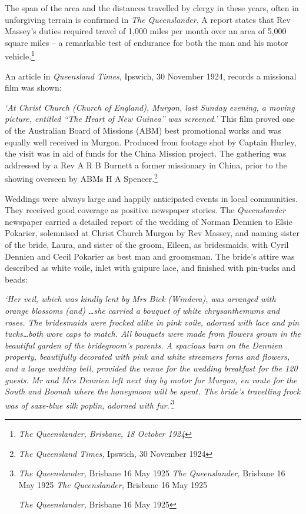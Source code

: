 The span of the area and the distances travelled by clergy in these years, often in unforgiving terrain is confirmed in \emph{The Queenslander}. A report states that Rev Massey's duties required travel of 1,000 miles per month over an area of 5,000 square miles -- a remarkable test of endurance for both the man and his motor vehicle.\footnote{\emph{The Queenslander, Brisbane, 18 October 1924}}


An article in \emph{Queensland Times}, Ipswich, 30 November 1924, records a missional film was shown:



\emph{`At Christ Church (Church of England), Murgon, last Sunday evening, a moving picture, entitled ``The Heart of New Guinea'' was screened.'} This film proved one of the Australian Board of Missions (ABM) best promotional works and was equally well received in Murgon. Produced from footage shot by Captain Hurley, the visit was in aid of funds for the China Mission project\emph{.} The gathering was addressed by a Rev A R B Burnett a former missionary in China, prior to the showing overseen by ABMs H A Spencer.\footnote{\emph{The Queensland Times,} Ipswich, 30 November 1924}


Weddings were always large and happily anticipated events in local communities. They received good coverage as positive newspaper stories. The \emph{Queenslander} newspaper carried a detailed report of the wedding of Norman Dennien to Elsie Pokarier, solemnised at Christ Church Murgon by Rev Massey, and naming sister of the bride, Laura, and sister of the groom, Eileen, as bridesmaids, with Cyril Dennien and Cecil Pokarier as best man and groomsman. The bride's attire was described as white voile, inlet with guipure lace, and finished with pin-tucks and beads:



\emph{`Her veil, which was kindly lent by Mrs Bick (Windera), was arranged with orange blossoms (and) \ldots she carried a bouquet of white chrysanthemums and roses. The bridesmaids were frocked alike in pink voile, adorned with lace and pin tucks\ldots both wore caps to match. All bouquets were made from flowers grown in the beautiful garden of the bridegroom's parents. A spacious barn on the Dennien property, beautifully decorated with pink and white streamers ferns and flowers, and a large wedding bell, provided the venue for the wedding breakfast for the 120 guests. Mr and Mrs Dennien left next day by motor for Murgon, en route for the South and Boonah where the honeymoon will be spent. The bride's travelling frock was of saxe-blue silk poplin, adorned with fur.'}\footnote{\emph{The Queenslander,} Brisbane 16 May 1925 \emph{The Queenslander,} Brisbane 16 May 1925 \emph{The Queenslander,} Brisbane 16 May 1925


  \emph{The Queenslander,} Brisbane 16 May 1925}



